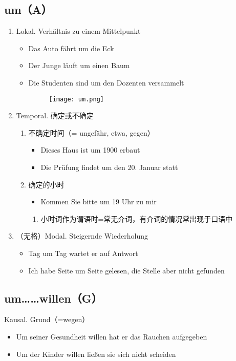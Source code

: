 \documentclass[UTF8]{report}
\begin{document}
\subsection{um（A）}
\begin{enumerate}
    \item Lokal. Verhältnis zu einem Mittelpunkt
    \begin{itemize}
        \item Das Auto fährt um die Eck
        \item Der Junge läuft um einen Baum
        \item Die Studenten sind um den Dozenten versammelt
        \begin{figure}[H]
            \centering
            \texttt{[image: um.png]}
        \end{figure}
    \end{itemize}
    \item Temporal. 确定或不确定
    \begin{enumerate}
        \item 不确定时间（= ungefähr, etwa, gegen）
        \begin{itemize}
            \item Dieses Haus ist um 1900 erbaut
            \item Die Prüfung findet um den 20. Januar statt
        \end{itemize}
        \item 确定的小时
        \begin{itemize}
            \item Kommen Sie bitte um 19 Uhr zu mir
        \end{itemize}
        \begin{enumerate}
            \item 小时词作为谓语时=常无介词，有介词的情况常出现于口语中
        \end{enumerate}
    \end{enumerate}
    \item （无格）Modal. Steigernde Wiederholung
    \begin{itemize}
        \item Tag um Tag wartet er auf Antwort
        \item Ich habe Seite um Seite gelesen, die Stelle aber nicht gefunden
    \end{itemize}
\end{enumerate}

\subsection{um……willen（G）}
Kausal. Grund（=wegen）
\begin{itemize}
    \item Um seiner Gesundheit willen hat er das Rauchen aufgegeben
    \item Um der Kinder willen ließen sie sich nicht scheiden
\end{itemize}
\end{document}
